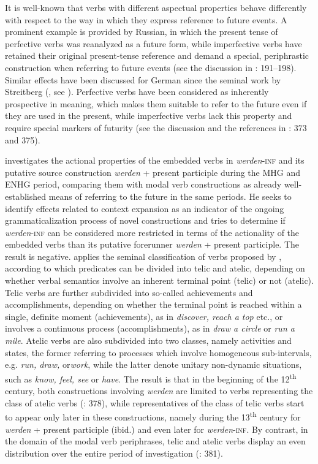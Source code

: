 \documentclass[output=paper,colorlinks,citecolor=brown]{langscibook}
\begin{document}
It is well-known that verbs with different aspectual properties behave differently with respect to the way in which they express reference to future events. A prominent example is provided by Russian, in which the present tense of perfective verbs was reanalyzed as a future form, while imperfective verbs have retained their original present-tense reference and demand a special, periphrastic construction when referring to future events (see the discussion in \cite{Leiss1992}: 191–198). Similar effects have been discussed for German since the seminal work by Streitberg (\citeyear{Streitberg1891}, see \cite{Leiss1992}). Perfective verbs have been considered as inherently prospective in meaning, which makes them suitable to refer to the future even if they are used in the present, while imperfective verbs lack this property and require special markers of futurity (see the discussion and the references in \cite{Hartmann2021}: 373 and 375).

\citet{Hartmann2021} investigates the actional properties of the embedded verbs in \textit{werden}-\textsc{inf} and its putative source construction \textit{werden} + present participle during the MHG and ENHG period, comparing them with modal verb constructions as already well-established means of referring to the future in the same periods. He seeks to identify effects related to context expansion as an indicator of the ongoing grammaticalization process of novel constructions and tries to determine if \textit{werden}-\textsc{inf} can be considered more restricted in terms of the actionality of the embedded verbs than its putative forerunner \textit{werden} + present participle. The result is negative. \citet{Hartmann2021} applies the seminal classification of verbs proposed by \citet{Vendler1957}, according to which predicates can be divided into telic and atelic, depending on whether verbal semantics involve an inherent terminal point (telic) or not (atelic). Telic verbs are further subdivided into so-called achievements and accomplishments, depending on whether the terminal point is reached within a single, definite moment (achievements), as in \textit{discover, reach a top} etc., or involves a continuous process (accomplishments), as in \textit{draw a circle} or \textit{run a mile}. Atelic verbs are also subdivided into two classes, namely activities and states, the former referring to processes which involve homogeneous sub-intervals, e.g. \textit{run, draw, }or\textit{work}, while the latter denote unitary non-dynamic situations, such as \textit{know, feel, see} or \textit{have}. The result is that in the beginning of the 12\textsuperscript{th} century, both constructions involving \textit{werden} are limited to verbs representing the class of atelic verbs (\cite{Hartmann2021}: 378), while representatives of the class of telic verbs start to appear only later in these constructions, namely during the 13\textsuperscript{th} century for \textit{werden} + present participle (ibid.) and even later for \textit{werden}-\textsc{inf}. By contrast, in the domain of the modal verb periphrases, telic and atelic verbs display an even distribution over the entire period of investigation (\cite{Hartmann2021}: 381).
\end{document}
